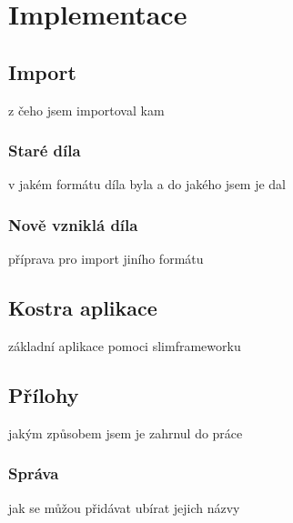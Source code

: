 \chapter{Implementace}

    \section{Import}
        z čeho jsem importoval kam
        \subsection{Staré díla}
            v jakém formátu díla byla a do jakého jsem je dal
        \subsection{Nově vzniklá díla}
            příprava pro import jiního formátu
    \section{Kostra aplikace}
        základní aplikace pomoci slimframeworku
    \section{Přílohy}
        jakým způsobem jsem je zahrnul do práce
        \subsection{Správa}
            jak se můžou přidávat ubírat jejich názvy
